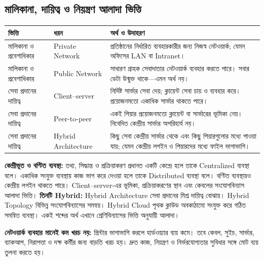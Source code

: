 \subsection{মালিকানা, দায়িত্ব ও নিয়ন্ত্রণ আলাদা ভিত্তি}
\begin{tabularx}{\linewidth}{|p{.23\linewidth}|X|X|}
\hline
\textbf{ভিত্তি} & \textbf{ধরন} & \textbf{অর্থ ও উদাহরণ}\\\hline
মালিকানা ও প্রবেশাধিকার & Private Network & প্রতিষ্ঠানের নির্ধারিত ব্যবহারকারীর জন্য নিজস্ব নেটওয়ার্ক; যেমন অফিসের LAN বা Intranet।\\\hline
মালিকানা ও প্রবেশাধিকার & Public Network & সাধারণ গ্রাহক সেবাদাতার নেটওয়ার্ক ব্যবহার করতে পারে। সবার ডেটা উন্মুক্ত থাকে—এমন অর্থ নয়।\\\hline
সেবা প্রদানের দায়িত্ব & Client–server & নির্দিষ্ট সার্ভার সেবা দেয়; ক্লায়েন্ট সেবা চায় ও ব্যবহার করে। প্রয়োজনমতো একাধিক সার্ভার থাকতে পারে।\\\hline
সেবা প্রদানের দায়িত্ব & Peer-to-peer & একই পিয়ার প্রয়োজনমতো ক্লায়েন্ট বা সার্ভারের ভূমিকা নেয়। নিবেদিত কেন্দ্রীয় সার্ভার অপরিহার্য নয়।\\\hline
সেবা প্রদানের দায়িত্ব & Hybrid Architecture & কিছু সেবা কেন্দ্রীয় সার্ভার থেকে এবং কিছু পিয়ারগুলোর মধ্যে পাওয়া যায়; যেমন কেন্দ্রীয় লগইন ও পিয়ারদের মধ্যে ফাইল ভাগাভাগি।\\\hline
\end{tabularx}
\textbf{কেন্দ্রীভূত ও বণ্টিত ব্যবস্থা:} তথ্য, সিদ্ধান্ত ও প্রক্রিয়াকরণ প্রধানত একটি কেন্দ্রে হলে তাকে Centralized ব্যবস্থা বলে। একাধিক সংযুক্ত ব্যবস্থায় কাজ ভাগ করে দেওয়া হলে তাকে Distributed ব্যবস্থা বলে। বণ্টিত ব্যবস্থায়ও কেন্দ্রীয় লগইন থাকতে পারে। Client–server-এর ভূমিকা, প্রক্রিয়াকরণের স্থান এবং কেবলের সংযোগবিন্যাস আলাদা ভিত্তি।
\textbf{তিনটি Hybrid:} Hybrid Architecture সেবা প্রদানের মিশ্র দায়িত্ব বোঝায়। Hybrid Topology বিভিন্ন সংযোগবিন্যাসের সমন্বয়। Hybrid Cloud পৃথক ক্লাউড অবকাঠামো সংযুক্ত করে গঠিত সমন্বিত ব্যবস্থা। একই শব্দের অর্থ এখানে শ্রেণিবিন্যাসের ভিত্তি অনুযায়ী আলাদা।

\textbf{নেটওয়ার্ক ব্যবহার মানেই কম খরচ নয়:} প্রিন্টার ভাগাভাগি করলে হার্ডওয়্যার ব্যয় কমে। তবে কেবল, সুইচ, সার্ভার, ব্যাকআপ, নিরাপত্তা ও দক্ষ কর্মীর জন্য বাড়তি খরচ হয়। দ্রুত কাজ, নিয়ন্ত্রণ ও নির্ভরযোগ্যতার সুবিধার সঙ্গে মোট ব্যয় তুলনা করতে হয়।

